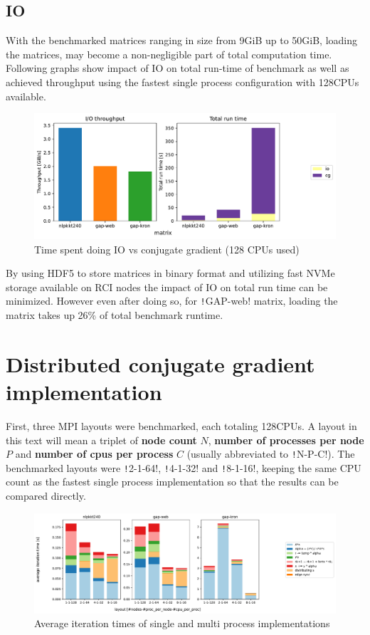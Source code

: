 \documentclass[thesis=M,english]{FITthesis}[2019/12/23]
\newcommand{\csre}[1]{\texttt!#1!}
\begin{document}
\subsection{IO}

With the benchmarked matrices ranging in size from 9GiB up to 50GiB, loading the matrices,
may become a non-negligible part of total computation time. Following graphs show impact of
IO on total run-time of benchmark as well as achieved throughput using the fastest single process
configuration with 128CPUs available.

\begin{figure}[htp]
    \centering
    \includegraphics[scale=0.5]{static/io_sp.pdf}
    \caption{Time spent doing IO vs conjugate gradient (128 CPUs used)}
\end{figure}

By using HDF5 to store matrices in binary format and utilizing fast NVMe storage available
on RCI nodes the impact of IO on total run time can be minimized. However even after doing so,
for \csre{GAP-web} matrix, loading the matrix takes up 26\% of total benchmark runtime.


\section{Distributed conjugate gradient implementation}

First, three MPI layouts were benchmarked, each totaling 128CPUs. A layout
in this text will mean a triplet of \textbf{node count} $N$,
\textbf{number of processes per node} $P$
and \textbf{number of cpus per process} $C$ (usually abbreviated to \csre{N-P-C}).
The benchmarked layouts were \csre{2-1-64}, \csre{4-1-32} and \csre{8-1-16}, keeping
the same CPU count as the fastest single process implementation so that the results
can be compared directly.

\begin{figure}[htp]
    \centering
    \includegraphics[scale=0.35]{static/mpi.pdf}
    \caption{Average iteration times of single and multi process implementations}
\end{figure}
\end{document}
